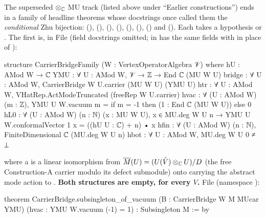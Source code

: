 \begin{warning}[title={The MU track's carrier-bridge families are empty: its ``trophy'' theorems are vacuous (serious; found by an external reviewer)}]\label{l13:warn:carrierbridge}
The superseded $\otimes_{\mathbb{C}}$ MU track (listed above under ``Earlier constructions'') ends in a family of headline theorems whose
docstrings once called them the \emph{conditional} Zhu bijection: 
(),  (),
 (),  (),
 (), 
(), 
() and 
(). Each takes a hypothesis  or
. The first is, in File 
(field docstrings omitted;  in  has the same fields with
 in place of ):
\begin{leancode}
structure CarrierBridgeFamily (W : VertexOperatorAlgebra 𝒱) where
  hU : AMod W → ℂ
  YMU : ∀ U : AMod W, 𝒱 → ℤ → End ℂ (MU W U)
  bridge : ∀ U : AMod W, CarrierBridge W U.carrier (MU W U) (YMU U)
  htr : ∀ U : AMod W, VHatRep.ActModeTruncated (freeRep W U.carrier)
  hvac : ∀ (U : AMod W) (m : ℤ),
    YMU U W.vacuum m = if m = -1 then (1 : End ℂ (MU W U)) else 0
  hL0 : ∀ (U : AMod W) (n : ℕ) (x : MU W U), x ∈ MU.deg W U n →
    YMU U W.conformalVector 1 x = ((hU U : ℂ) + n) • x
  hfin : ∀ (U : AMod W) (n : ℕ), FiniteDimensional ℂ (MU.deg W U n)
  hbot : ∀ U : AMod W, MU.deg W U 0 ≠ ⊥
\end{leancode}
where a  is a linear isomorphism from $\overline M(U)=(U(\hat V)\otimes_{\mathbb{C}} U)/D$ (the free
Construction-A carrier modulo its defect submodule) onto  carrying the abstract mode action to . \textbf{Both
structures are empty, for every $V$.} File 
(namespace ):
\begin{leancode}
theorem CarrierBridge.subsingleton_of_vacuum (B : CarrierBridge W M MUcar YMU)
    (hvac : YMU W.vacuum (-1) = 1) : Subsingleton M := by


\end{leancode}
\end{warning}
